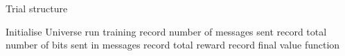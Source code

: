 \begin{algorithm}
    \caption{Trial structure}\label{alg:Task1}
    \begin{algorithmic}
    \State Initialise Universe
            \State run training
                \State record number of messages sent
                \State record total number of bits sent in messages
                \State record total reward
                \State record final value function
                \State 

            \EndFor
        \EndFor
    \EndFor
    \end{algorithmic}
\end{algorithm}    

\cite{AdA}
